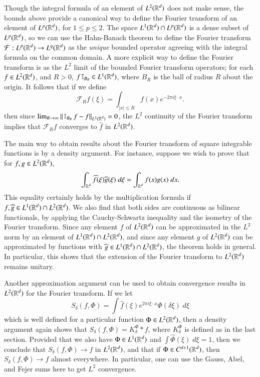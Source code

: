Though the integral formula of an element of $L^2(\operatorname{\mathbb{R}}^d)$ does not make sense, the bounds above provide a canonical way to define the Fourier transform of an element of $L^p(\operatorname{\mathbb{R}}^d)$, for $1 \leq p \leq 2$. The space $L^1(\operatorname{\mathbb{R}}^d) \cap L^p(\operatorname{\mathbb{R}}^d)$ is a dense subset of $L^p(\operatorname{\mathbb{R}}^d)$, so we can use the Hahn-Banach theorem to define the Fourier transform $\mathcal{F}: L^p(\operatorname{\mathbb{R}}^d) \to L^q(\operatorname{\mathbb{R}}^d)$ as the {\it unique} bounded operator agreeing with the integral formula on the common domain. A more explicit way to define the Fourier transform is as the $L^2$ limit of the bounded Fourier transform operators; for each $f \in L^2(\operatorname{\mathbb{R}}^d)$, and $R > 0$, $f \operatorname{\mathbb{I}}_{B_R} \in L^1(\operatorname{\mathbb{R}}^d)$, where $B_R$ is the ball of radius $R$ about the origin. It follows that if we define
%
\[ \mathcal{F}_R f (\xi) = \int_{|x| \leq R} f(x) e^{-2 \pi i \xi \cdot x}. \]
%
then since $\lim_{R \to \infty} \| \operatorname{\mathbb{I}}_{B_R} f - f \|_{L^2(\operatorname{\mathbb{R}}^d)} = 0$, the $L^2$ continuity of the Fourier transform implies that $\mathcal{F}_R f$ converges to $\widehat{f}$ in $L^2(\operatorname{\mathbb{R}}^d)$.

The main way to obtain results about the Fourier transform of square integrable functions is by a density argument. For instance, suppose we wish to prove that for $f,g \in L^2(\operatorname{\mathbb{R}}^d)$,
%
\[ \int_{\operatorname{\mathbb{R}}^d} \widehat{f}(\xi) \widehat{g}(\xi)\; d\xi = \int_{\operatorname{\mathbb{R}}^d} f(x) g(x)\; dx. \]
%
This equality certainly holds by the multiplication formula if $f,\widehat{g} \in L^1(\operatorname{\mathbb{R}}^d) \cap L^2(\operatorname{\mathbb{R}}^d)$. We also find that both sides are continuous as bilinear functionals, by applying the Cauchy-Schwartz inequality and the isometry of the Fourier transform. Since any element $f$ of $L^2(\operatorname{\mathbb{R}}^d)$ can be approximated in the $L^2$ norm by an element of $L^1(\operatorname{\mathbb{R}}^d) \cap L^2(\operatorname{\mathbb{R}}^d)$, and since any element $g$ of $L^2(\operatorname{\mathbb{R}}^d)$ can be approximated by functions with $\widehat{g} \in L^1(\operatorname{\mathbb{R}}^d) \cap L^2(\operatorname{\mathbb{R}}^d)$, the theorem holds in general. In particular, this shows that the extension of the Fourier transform to $L^2(\operatorname{\mathbb{R}}^d)$ remains unitary.

Another approximation argument can be used to obtain convergence results in $L^2(\operatorname{\mathbb{R}}^d)$ for the Fourier transform. If we let
%
\[ S_\delta(f,\Phi) = \int \widehat{f}(\xi) e^{2 \pi i \xi \cdot x} \Phi(\delta \xi)\; d\xi \]
%
which is well defined for a particular function $\Phi \in L^2(\operatorname{\mathbb{R}}^d)$, then a density argument again shows that $S_\delta(f,\Phi) = K_\delta^\Phi * f$, where $K_\delta^\Phi$ is defined as in the last section. Provided that we also have $\Phi \in L^1(\operatorname{\mathbb{R}}^d)$ and $\int \widehat{\Phi}(\xi)\; d\xi = 1$, then we conclude that $S_\delta(f,\Phi) \to f$ in $L^2(\operatorname{\mathbb{R}}^d)$, and that if $\Phi \in C^{d+1}(\operatorname{\mathbb{R}}^d)$, then $S_\delta(f,\Phi) \to f$ almost everywhere. In particular, one can use the Gauss, Abel, and Fejer sums here to get $L^2$ convergence.

